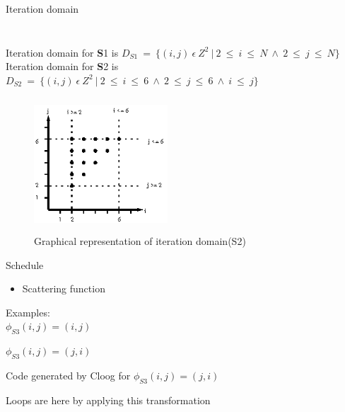 \documentclass{beamer}
\begin{document}
\begin{frame}[shrink]{Iteration domain}
\begin{columns}[t]
	\begin{block}{ }
	{\tiny}
	\end{block}
	
	\begin{block}{ }
	{\tiny}
	\end{block}
	\end{columns}
\pause
Iteration domain for {\textbf S1} is 
$D_{S1}\ =\ \{(i,j)\ \epsilon\ Z^2\ |\ 2\ \leq\ i\ \leq\ N\ \wedge\ 2\ \leq\ j\ \leq\ N\}$
\linebreak\linebreak
Iteration domain for {\textbf S2} is 
$D_{S2}\ =\ \{(i,j)\ \epsilon\ Z^2\ |\ 2\ \leq\ i\ \leq\ 6\ \wedge\ 2\ \leq\ j\ \leq\ 6\ \wedge\ i\ \leq\ j\}$
\pause
\begin{figure}
\begin{center}
  \includegraphics[height=5cm,width=5cm]{images/iter1.eps}
  \caption{Graphical representation of iteration domain(S2)}
  \label{fig:iter1}
\end{center}  
\end{figure}
\end{frame}

\begin{frame}{Schedule}
\begin{itemize}
\item Scattering function
\end{itemize}

\pause

\begin{block}{ }
{\tiny}
\end{block}
Examples: \\
$\phi_{S3}(i,j) = (i,j)$

$\phi_{S3}(i,j) = (j,i)$

\pause

\begin{block}{Code generated by Cloog for $\phi_{S3}(i,j) = (j,i)$}
{\tiny}
\end{block}


Loops are \textbf{\color{red}{interchanged}} here by applying this transformation
\end{frame}
\end{document}
